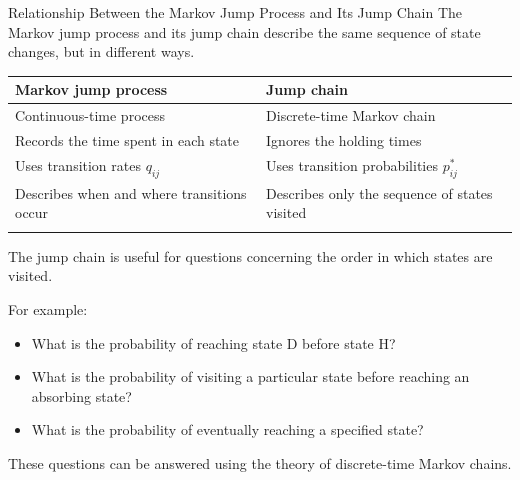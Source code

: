 \documentclass[
  ignorenonframetext,
  aspectratio=169,
]{beamer}
\newcounter{none} %
\providecommand{\tightlist}{%
  \setlength{\itemsep}{0pt}\setlength{\parskip}{0pt}}
\begin{document}
\begin{frame}{Relationship Between the Markov Jump Process and Its Jump
Chain}
\protect{}\label{relationship-between-the-markov-jump-process-and-its-jump-chain}
The Markov jump process and its jump chain describe the same sequence of
state changes, but in different ways.

{\def\LTcaptype{none} %
\begin{longtable}[]{@{}
  >{\raggedright\arraybackslash}p{}
  >{\raggedright\arraybackslash}p{}@{}}
\toprule\noalign{}
\begin{minipage}[b]{\linewidth}\raggedright
Markov jump process
\end{minipage} & \begin{minipage}[b]{\linewidth}\raggedright
Jump chain
\end{minipage} \\
\midrule\noalign{}
\endhead
Continuous-time process & Discrete-time Markov chain \\
Records the time spent in each state & Ignores the holding times \\
Uses transition rates \(q_{ij}\) & Uses transition probabilities
\(p_{ij}^*\) \\
Describes when and where transitions occur & Describes only the sequence
of states visited \\
\bottomrule\noalign{}
\end{longtable}
}

The jump chain is useful for questions concerning the order in which
states are visited.

For example:

\begin{itemize}
\tightlist
\item
  What is the probability of reaching state D before state H?
\item
  What is the probability of visiting a particular state before reaching
  an absorbing state?
\item
  What is the probability of eventually reaching a specified state?
\end{itemize}

These questions can be answered using the theory of discrete-time Markov
chains.
\end{frame}
\end{document}
